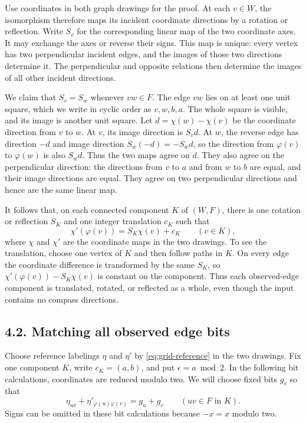 \documentclass[11pt,a4paper]{article}
\begin{document}
Use coordinates in both graph drawings for the proof.
At each \(v\in W\), the isomorphism therefore maps its incident coordinate directions by a rotation or reflection.
Write \(S_v\) for the corresponding linear map of the two coordinate axes.
It may exchange the axes or reverse their signs.
This map is unique: every vertex has two perpendicular incident edges, and the images of those two directions determine it.
The perpendicular and opposite relations then determine the images of all other incident directions.

We claim that \(S_v=S_w\) whenever \(vw\in F\).
The edge \(vw\) lies on at least one unit square, which we write in cyclic order as \(v,w,b,a\).
The whole square is visible, and its image is another unit square.
Let \(d=\chi(w)-\chi(v)\) be the coordinate direction from \(v\) to \(w\).
At \(v\), its image direction is \(S_vd\).
At \(w\), the reverse edge has direction \(-d\) and image direction \(S_w(-d)=-S_wd\), so the direction from \(\varphi(v)\) to \(\varphi(w)\) is also \(S_wd\).
Thus the two maps agree on \(d\).
They also agree on the perpendicular direction: the directions from \(v\) to \(a\) and from \(w\) to \(b\) are equal, and their image directions are equal.
They agree on two perpendicular directions and hence are the same linear map.

It follows that, on each connected component \(K\) of \((W,F)\), there is one rotation or reflection \(S_K\) and one integer translation \(c_K\) such that
\begin{equation} \chi'(\varphi(v))=S_K\chi(v)+c_K \qquad(v\in K), \label{eq:grid-coordinate-map} \end{equation}
where \(\chi\) and \(\chi'\) are the coordinate maps in the two drawings.
To see the translation, choose one vertex of \(K\) and then follow paths in \(K\).
On every edge the coordinate difference is transformed by the same \(S_K\), so \(\chi'(\varphi(v))-S_K\chi(v)\) is constant on the component.
Thus each observed-edge component is translated, rotated, or reflected as a whole, even though the input contains no compass directions.

\subsection{4.2. Matching all observed edge bits}

Choose reference labelings \(\eta\) and \(\eta'\) by \eqref{eq:grid-reference} in the two drawings.
Fix one component \(K\), write \(c_K=(a,b)\), and put \(\epsilon=a\bmod2\).
In the following bit calculations, coordinates are reduced modulo two.
We will choose fixed bits \(g_v\) so that
\begin{equation} \eta_{uv}+\eta'_{\varphi(u)\varphi(v)}=g_u+g_v \qquad(uv\in F\text{ in }K). \label{eq:grid-reference-difference} \end{equation}
Signs can be omitted in these bit calculations because \(-x=x\) modulo two.
\end{document}
